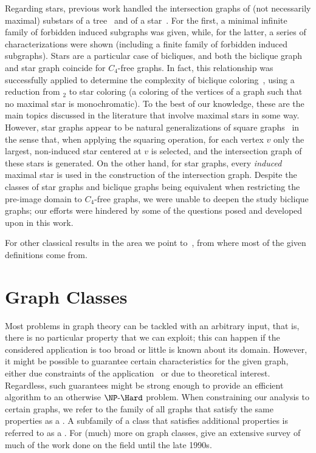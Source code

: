 Regarding stars, previous work handled the intersection graphs of (not necessarily maximal) substars of a tree~\citep{substar_graph} and of a star~\citep{starlike_graph}.
For the first, a minimal infinite family of forbidden induced subgraphs was given, while, for the latter, a series of characterizations were shown (including a finite family of forbidden induced subgraphs).
Stars are a particular case of bicliques, and both the biclique graph and star graph coincide for $C_4$-free graphs.
In fact, this relationship was successfully applied to determine the complexity of biclique coloring~\citep{biclique_coloring_complexity}, using a reduction from $_2$ to star coloring (a coloring of the vertices of a graph such that no maximal star is monochromatic).
To the best of our knowledge, these are the main topics discussed in the literature that involve maximal stars in some way.
However, star graphs appear to be natural generalizations of square graphs~\cite{murty} in the sense that, when applying the squaring operation, for each vertex $v$ only the largest, non-induced star centered at $v$ is selected, and the intersection graph of these stars is generated.
On the other hand, for star graphs, every \textit{induced} maximal star is used in the construction of the intersection graph.
Despite the classes of star graphs and biclique graphs being equivalent when restricting the  pre-image domain to $C_4$-free graphs, we were unable to deepen the study biclique graphs; our efforts were hindered by some of the questions posed and developed upon in this work.


For other classical results in the area we point to~\citep{intersection_graphs}, from where most of the given definitions come from.

\section{Graph Classes}
\label{sec:graph_classes}

Most problems in graph theory can be tackled with an arbitrary input, that is, there is no particular property that we can exploit; this can happen if the considered application is too broad or little is known about its domain.
However, it might be possible to guarantee certain characteristics for the given graph, either due constraints of the application~\citep{fernando_chordal} or due to theoretical interest.
Regardless, such guarantees might be strong enough to provide an efficient algorithm to an otherwise $\NPH$ problem.
When constraining our analysis to certain graphs, we refer to the family of all graphs that satisfy the same properties as a .
A subfamily of a class that satisfies additional properties is referred to as a .
For (much) more on graph classes, \citep{classes_survey} give an extensive survey of much of the work done on the field until the late 1990s.

